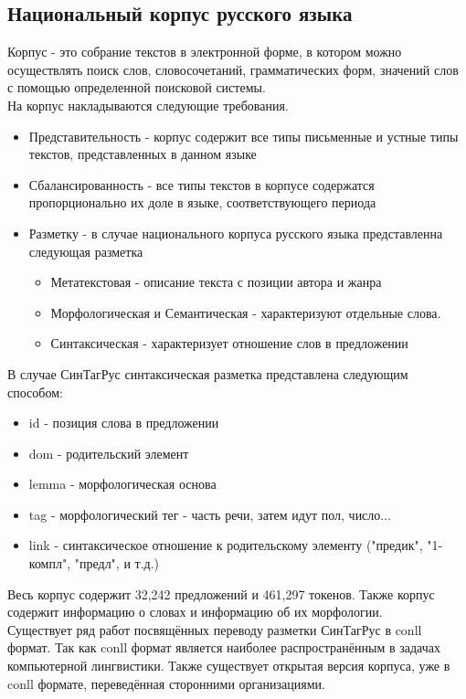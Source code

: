 \subsection{Национальный корпус русского языка}
Корпус - это собрание текстов в электронной форме, в котором можно осуществлять поиск слов, словосочетаний, грамматических форм, значений слов с помощью определенной поисковой системы.\\
На корпус накладываются следующие требования.
\begin{itemize}
\item Представительность - корпус содержит все типы письменные и устные типы текстов, представленных в данном языке
\item Сбалансированность - все типы текстов в корпусе содержатся пропорционально их доле в языке, соответствующего периода
\item Разметку - в случае национального корпуса русского языка представленна следующая разметка
\begin{itemize}
\item Метатекстовая - описание текста с позиции автора и жанра
\item Морфологическая и Семантическая - характеризуют отдельные слова.
\item Синтаксическая - характеризует отношение слов в предложении
\end{itemize}
\end{itemize}
В случае СинТагРус синтаксическая разметка представлена следующим способом:\cite{conll}\\
\begin{itemize}
\item id - позиция слова в предложении 
\item dom - родительский элемент
\item lemma - морфологическая основа
\item tag - морфологический тег - часть речи, затем идут пол, число...
\item link - синтаксическое отношение к родительскому элементу ("предик", "1-компл", "предл", и т.д.)
\end{itemize}
Весь корпус содержит 32,242 предложений и 461,297 токенов.
Также корпус содержит информацию о словах и информацию об их морфологии.\\
Существует ряд работ посвящённых переводу разметки СинТагРус в conll формат. Так как conll формат является наиболее распространённым в задачах компьютерной лингвистики. Также существует открытая версия корпуса, уже в conll формате, переведённая сторонними организациями.
